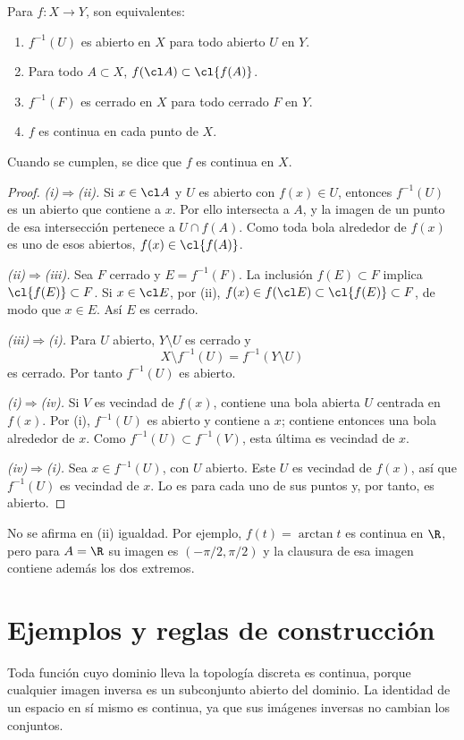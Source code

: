 \begin{teorema}\label{ch05:criterios}
Para $f:X\to Y$, son equivalentes:
\begin{enumerate}[label=(\roman*)]
\item $f^{-1}(U)$ es abierto en $X$ para todo abierto $U$ en $Y$.
\item Para todo $A\subset X$, $f(\cl A)\subset\cl{f(A)}$.
\item $f^{-1}(F)$ es cerrado en $X$ para todo cerrado $F$ en $Y$.
\item $f$ es continua en cada punto de $X$.
\end{enumerate}
Cuando se cumplen, se dice que $f$ es continua en $X$.
\end{teorema}
\begin{proof}
\emph{(i)$\Rightarrow$(ii).} Si $x\in\cl A$ y $U$ es abierto con $f(x)\in U$, entonces $f^{-1}(U)$ es un abierto que contiene a $x$. Por ello intersecta a $A$, y la imagen de un punto de esa intersección pertenece a $U\cap f(A)$. Como toda bola alrededor de $f(x)$ es uno de esos abiertos, $f(x)\in\cl{f(A)}$.

\emph{(ii)$\Rightarrow$(iii).} Sea $F$ cerrado y $E=f^{-1}(F)$. La inclusión $f(E)\subset F$ implica $\cl{f(E)}\subset F$. Si $x\in\cl E$, por (ii), $f(x)\in f(\cl E)\subset\cl{f(E)}\subset F$, de modo que $x\in E$. Así $E$ es cerrado.

\emph{(iii)$\Rightarrow$(i).} Para $U$ abierto, $Y\setminus U$ es cerrado y
\[
X\setminus f^{-1}(U)=f^{-1}(Y\setminus U)
\]
es cerrado. Por tanto $f^{-1}(U)$ es abierto.

\emph{(i)$\Rightarrow$(iv).} Si $V$ es vecindad de $f(x)$, contiene una bola abierta $U$ centrada en $f(x)$. Por (i), $f^{-1}(U)$ es abierto y contiene a $x$; contiene entonces una bola alrededor de $x$. Como $f^{-1}(U)\subset f^{-1}(V)$, esta última es vecindad de $x$.

\emph{(iv)$\Rightarrow$(i).} Sea $x\in f^{-1}(U)$, con $U$ abierto. Este $U$ es vecindad de $f(x)$, así que $f^{-1}(U)$ es vecindad de $x$. Lo es para cada uno de sus puntos y, por tanto, es abierto.
\end{proof}
No se afirma en (ii) igualdad. Por ejemplo, $f(t)=\arctan t$ es continua en $\R$, pero para $A=\R$ su imagen es $(-\pi/2,\pi/2)$ y la clausura de esa imagen contiene además los dos extremos.

\section{Ejemplos y reglas de construcción}
Toda función cuyo dominio lleva la topología discreta es continua, porque cualquier imagen inversa es un subconjunto abierto del dominio. La identidad de un espacio en sí mismo es continua, ya que sus imágenes inversas no cambian los conjuntos.

